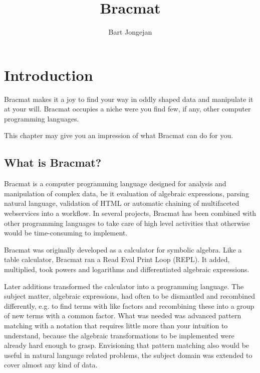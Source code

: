 \documentclass[12pt]{article}
\begin{document}
\title{Bracmat}
\author{Bart Jongejan}

\maketitle

\newpage

\tableofcontents

\newpage

\section{Introduction}

Bracmat makes it a joy to find your way in oddly shaped data and
manipulate it at your will. Bracmat occupies a niche were you find
few, if any, other computer programming languages.

This chapter may give you an impression of what Bracmat can do for
you.

\subsection{What is Bracmat?}

Bracmat is a computer programming language designed for analysis and
manipulation of complex data, be it evaluation of algebraic
expressions, parsing natural language, validation of HTML or automatic
chaining of multifaceted webservices into a workflow. In several
projects, Bracmat has been combined with other programming languages
to take care of high level activities that otherwise would be 
time-consuming to implement.

Bracmat was originally developed as a calculator for symbolic
algebra. Like a table calculator, Bracmat ran a Read Eval Print
Loop (REPL). It added, multiplied, took powers and logarithms and
differentiated algebraic expressions.

Later additions transformed the calculator into a programming
language. The subject matter, algebraic expressions, had often to be
dismantled and recombined differently, e.g. to find terms
with like factors and recombining these into a group of new terms with
a common factor. What was needed was advanced pattern matching with a
notation that requires little more than your intuition to understand,
because the algebraic transformations to be implemented were already
hard enough to grasp. Envisioning that pattern matching also would be
useful in natural language related problems, the subject domain
was extended to cover almost any kind of data.
\end{document}
